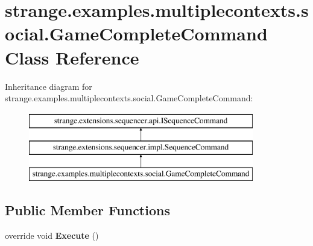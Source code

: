 \hypertarget{classstrange_1_1examples_1_1multiplecontexts_1_1social_1_1_game_complete_command}{\section{strange.\-examples.\-multiplecontexts.\-social.\-Game\-Complete\-Command Class Reference}
\label{classstrange_1_1examples_1_1multiplecontexts_1_1social_1_1_game_complete_command}
}
Inheritance diagram for strange.\-examples.\-multiplecontexts.\-social.\-Game\-Complete\-Command\-:\begin{figure}[H]
\begin{center}
\leavevmode
\includegraphics[height=3.000000cm]{classstrange_1_1examples_1_1multiplecontexts_1_1social_1_1_game_complete_command}
\end{center}
\end{figure}
\subsection*{Public Member Functions}
\begin{DoxyCompactItemize}
\item 
\hypertarget{classstrange_1_1examples_1_1multiplecontexts_1_1social_1_1_game_complete_command_a8b4c2c9c6276106ac2af1cf8677e1ee8}{override void {\bfseries Execute} ()}\label{classstrange_1_1examples_1_1multiplecontexts_1_1social_1_1_game_complete_command_a8b4c2c9c6276106ac2af1cf8677e1ee8}

\end{DoxyCompactItemize}
